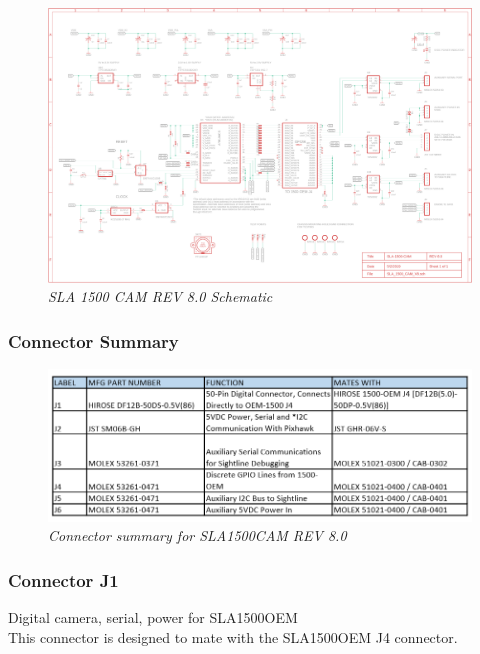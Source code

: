 \documentclass[11pt]{article}
\begin{document}
\begin{landscape}
   \begin{figure}[H]
	\centering	
	\includegraphics[width=9.5in]{SLA1500CAM_V8_sch}
	\caption{\textit{SLA 1500 CAM REV 8.0 Schematic}}	
	\end{figure}
\end{landscape}

\subsubsection{Connector Summary}

    \begin{figure}[H]
	\centering	
	\includegraphics[width=7 in]{SLA1500CAM_CONN_V3}
	\caption{\textit{Connector summary for SLA1500CAM REV 8.0}}	
	\end{figure}

\newpage

\subsubsection{Connector J1}

Digital camera, serial, power for SLA1500OEM
\\
This connector is designed to mate with the SLA1500OEM J4 connector. 
\end{document}
